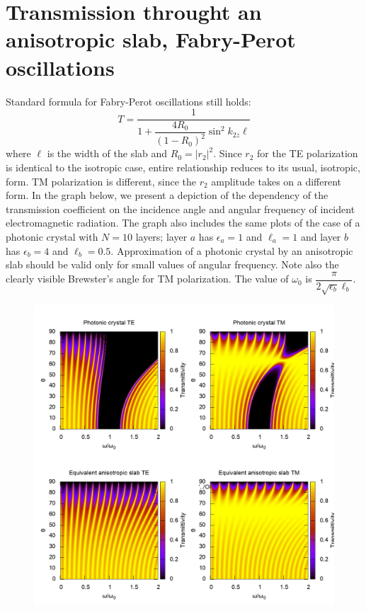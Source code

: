 \documentclass[a4paper]{scrartcl}
\begin{document}
\section{Transmission throught an anisotropic slab, Fabry-Perot oscillations}
Standard formula for Fabry-Perot oscillations still holds:
\begin{equation}
      T = \dfrac{1}{1 + \dfrac{4R_0}{(1-R_0)^2}\sin^2 k_{2z} \ell}
\end{equation}
where $\ell$ is the width of the slab and $R_0 = \left|r_2\right|^2$. Since $r_2$ for the TE polarization is identical
to the isotropic case, entire relationship reduces to its usual, isotropic, form. TM polarization is different, since
the $r_2$ amplitude takes on a different form. In the graph below, we present a depiction of the dependency of the
transmission coefficient on the incidence angle and angular frequency of incident electromagnetic radiation. The graph
also includes the same plots of the case of a photonic crystal with $N=10$ layers; layer $a$ has $\epsilon_a=1$ and
$\ell_a=1$ and layer $b$ has $\epsilon_b = 4$ and $\ell_b = 0.5$. Approximation of a photonic crystal by an anisotropic
slab should be valid only for small values of angular frequency. Note also the clearly visible Brewster's angle for TM
polarization. The value of $\omega_0$ is $\dfrac{\pi}{2 \sqrt{\epsilon_b}\ell_b}$.
\begin{figure}[b!]
\centering
\includegraphics[width=0.85\linewidth]{../Fabry-Perot/Pics/Compare.png}
\end{figure}
\end{document}
